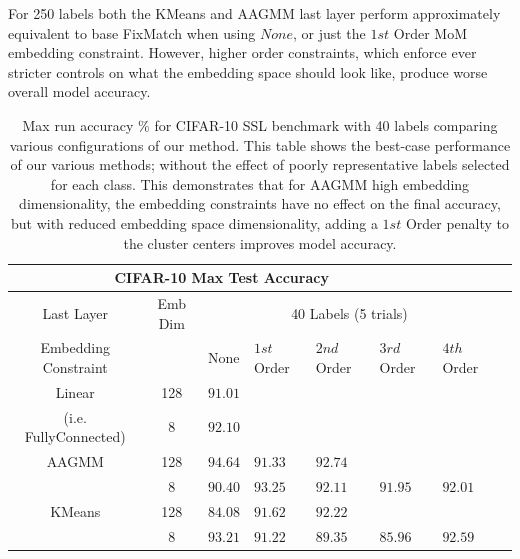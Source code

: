 \documentclass[10pt,twocolumn,letterpaper]{article}
\begin{document}
For 250 labels both the KMeans and AAGMM last layer perform approximately equivalent to base FixMatch when using $None$, or just the $1st$ Order MoM embedding constraint.
However, higher order constraints, which enforce ever stricter controls on what the embedding space should look like, produce worse overall model accuracy.

\begin{table}[ht!]
	\begin{tabularx}{\textwidth}{c|c|XXXXXX}
		\multicolumn{6}{c}{CIFAR-10 Max Test Accuracy} \\ \hline\hline
		Last Layer &   Emb Dim   & \multicolumn{5}{c}{40 Labels (5 trials)}            \\ 
		\hline
		Embedding Constraint  &  & None & $1st$ Order & $2nd$ Order & $3rd$ Order & $4th$ Order  \\ 
		\hline
		Linear & 128  & $91.01$   &  &  &  &   \\
		(i.e. FullyConnected) & 8  & $92.10$    &  &  &  &   \\
		\hline
		AAGMM  & 128  & $\boldsymbol{94.64}$    & $91.33$   & $92.74$   &  &  \\
		& 8  & $90.40$    & $93.25$   & $92.11$   & $91.95$  & $92.01$  \\
		\hline
		KMeans & 128  & $84.08$    & $91.62$   & $92.22$  &  &  \\
		& 8  & $\boldsymbol{93.21}$    & $91.22$  & $89.35$  & $85.96$  & $92.59$  \\
	\end{tabularx}
	\caption{Max run accuracy \% for CIFAR-10 SSL benchmark with 40 labels comparing various configurations of our method. This table shows the best-case performance of our various methods; without the effect of poorly representative labels selected for each class. This demonstrates that for AAGMM high embedding dimensionality, the embedding constraints have no effect on the final accuracy, but with reduced embedding space dimensionality, adding a $1st$ Order penalty to the cluster centers improves model accuracy.}
	\label{table1.5}
\end{table}
\end{document}

